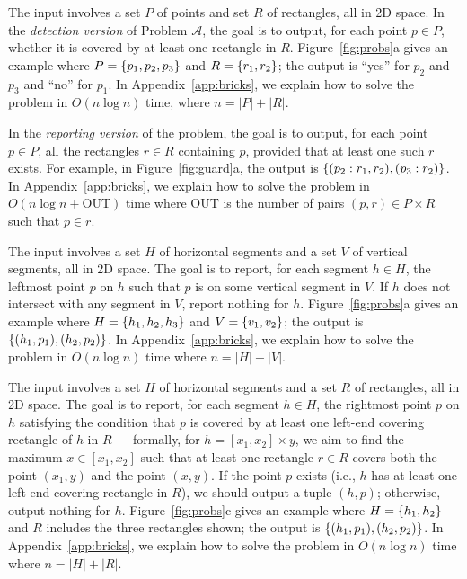 \documentclass[sigconf]{acmart}
\def\vgap{\vspace{1mm}}
\def\extraspacing{\vspace{2mm} \noindent}
\def\out{\mathrm{OUT}}
\begin{document}
\extraspacing {\bf Problem $\bm{\mathscr{A}}$.} The input involves a set $P$ of points and set $R$ of rectangles, all in 2D space. In the {\em detection version} of Problem $\mathscr{A}$, the goal is to output, for each point $p \in P$, whether it is covered by at least one rectangle in $R$. Figure~\ref{fig:probs}a gives an example where $P = \{p_1, p_2, p_3\}$ and $R = \{r_1, r_2\}$; the output is ``yes'' for $p_2$ and $p_3$ and ``no'' for $p_1$. In Appendix~\ref{app:bricks}, we explain how to solve the problem in $O(n \log n)$ time, where $n = |P| + |R|$.

\vgap

In the {\em reporting version} of the problem, the goal is to output, for each point $p \in P$, all the rectangles $r \in R$ containing $p$, provided that at least one such $r$ exists. For example, in Figure~\ref{fig:guard}a, the output is $\{(p_2: r_1, r_2), (p_3: r_2)\}$. In Appendix~\ref{app:bricks}, we explain how to solve the problem in $O(n \log n + \out)$ time where $\out$ is the number of pairs $(p, r) \in P \times R$ such that $p \in r$.

\extraspacing {\bf Problem $\bm{\mathscr{B}}$.} The input involves a set $H$ of horizontal segments and a set $V$ of vertical segments, all in 2D space. The goal is to report, for each segment $h \in H$, the leftmost point $p$ on $h$ such that $p$ is on some vertical segment in $V$. If $h$ does not intersect with any segment in $V$, report nothing for $h$. Figure~\ref{fig:probs}a gives an example where $H = \{h_1, h_2, h_3\}$ and $V = \{v_1, v_2\}$; the output is $\{(h_1, p_1), (h_2, p_2)\}$. In Appendix~\ref{app:bricks}, we explain how to solve the problem in $O(n \log n)$ time where $n = |H| + |V|$.


\extraspacing {\bf Problem $\bm{\mathscr{C}}$.} The input involves a set $H$ of horizontal segments and a set $R$ of rectangles, all in 2D space. The goal is to report, for each segment $h \in H$, the rightmost point $p$ on $h$ satisfying the condition that $p$ is covered by at least one left-end covering rectangle of $h$ in $R$ --- formally, for $h = [x_1, x_2] \times y$, we aim to find the maximum $x \in [x_1, x_2]$ such that at least one rectangle $r \in R$ covers both the point $(x_1, y)$ and the point $(x, y)$. If the point $p$ exists (i.e., $h$ has at least one left-end covering rectangle in $R$), we should output a tuple $(h, p)$; otherwise, output nothing for $h$. Figure~\ref{fig:probs}c gives an example where $H = \{h_1, h_2\}$ and $R$ includes the three rectangles shown; the output is $\{(h_1, p_1), (h_2, p_2)\}$. In Appendix~\ref{app:bricks}, we explain how to solve the problem in $O(n \log n)$ time where $n = |H| + |R|$.
\end{document}

